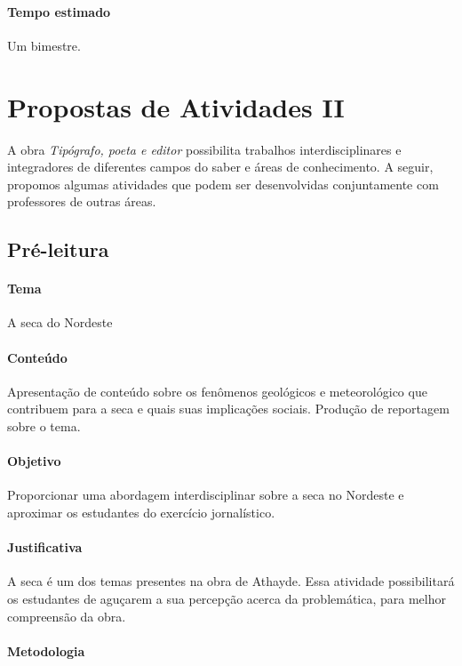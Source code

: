 \documentclass[12pt]{extarticle}
\begin{document}
\paragraph{Tempo estimado} Um bimestre.


\section{Propostas de Atividades II}

A obra \emph{Tipógrafo, poeta e editor} possibilita trabalhos
interdisciplinares e integradores de diferentes campos do saber e áreas de
conhecimento. A seguir, propomos algumas atividades que podem ser desenvolvidas
conjuntamente com professores de outras áreas.

\subsection{Pré-leitura}

\paragraph{Tema} A seca do Nordeste

\paragraph{Conteúdo} Apresentação de conteúdo sobre os fenômenos geológicos
e meteorológico que contribuem para a seca e quais suas implicações sociais.
Produção de reportagem sobre o tema.

\paragraph{Objetivo} Proporcionar uma abordagem interdisciplinar sobre a seca
no Nordeste e aproximar os estudantes do exercício jornalístico.

\paragraph{Justificativa} A seca é um dos temas presentes na obra de Athayde.
Essa atividade possibilitará os estudantes de aguçarem a sua percepção acerca
da problemática, para melhor compreensão da obra.

\paragraph{Metodologia}
\end{document}
